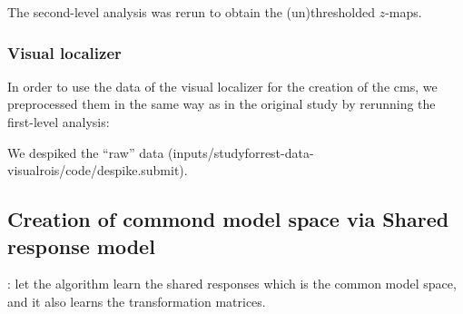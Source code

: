 The second-level analysis was rerun to obtain the (un)thresholded $z$-maps.


\subsubsection{Visual localizer}
In order to use the data of the visual localizer for the creation of the
\ac{cms}, we preprocessed them in the same way as in the original study
\citep{sengupta2016extension} by rerunning the first-level analysis:

We despiked the ``raw'' data
(inputs/studyforrest-data-visualrois/code/despike.submit).


\subsection{Creation of commond model space via Shared response model}

\citep{chen2015reduced}: let the algorithm learn the shared responses which is
the common model space, and it also learns the transformation matrices.
%






